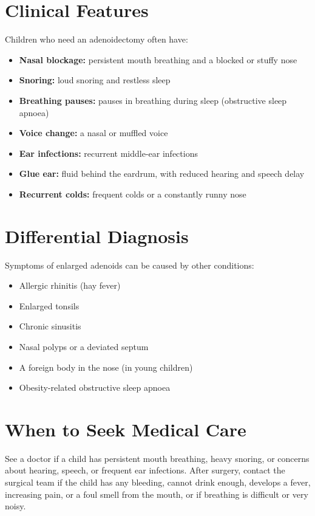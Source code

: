 \section*{Clinical Features}
Children who need an adenoidectomy often have:

\begin{itemize}
    \item \textbf{Nasal blockage:} persistent mouth breathing and a blocked or stuffy nose
    \item \textbf{Snoring:} loud snoring and restless sleep
    \item \textbf{Breathing pauses:} pauses in breathing during sleep (obstructive sleep apnoea)
    \item \textbf{Voice change:} a nasal or muffled voice
    \item \textbf{Ear infections:} recurrent middle-ear infections
    \item \textbf{Glue ear:} fluid behind the eardrum, with reduced hearing and speech delay
    \item \textbf{Recurrent colds:} frequent colds or a constantly runny nose
\end{itemize}

\section*{Differential Diagnosis}
Symptoms of enlarged adenoids can be caused by other conditions:

\begin{itemize}
    \item Allergic rhinitis (hay fever)
    \item Enlarged tonsils
    \item Chronic sinusitis
    \item Nasal polyps or a deviated septum
    \item A foreign body in the nose (in young children)
    \item Obesity-related obstructive sleep apnoea
\end{itemize}

\section*{When to Seek Medical Care}
See a doctor if a child has persistent mouth breathing, heavy snoring, or concerns about hearing, speech, or frequent ear infections. After surgery, contact the surgical team if the child has any bleeding, cannot drink enough, develops a fever, increasing pain, or a foul smell from the mouth, or if breathing is difficult or very noisy.

